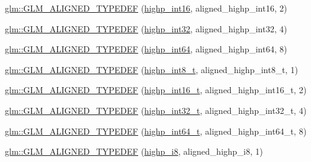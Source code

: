 \begin{DoxyCompactItemize}
\item 
\hyperlink{group__gtx__type__aligned_ga7a751b3aff24c0259f4a7357c2969089}{glm\+::\+G\+L\+M\+\_\+\+A\+L\+I\+G\+N\+E\+D\+\_\+\+T\+Y\+P\+E\+D\+EF} (\hyperlink{group__gtc__type__precision_gaf0430ed80e88c0d1dfbe47f359659c81}{highp\+\_\+int16}, aligned\+\_\+highp\+\_\+int16, 2)
\item 
\hyperlink{group__gtx__type__aligned_ga70cd2144351c556469ee6119e59971fc}{glm\+::\+G\+L\+M\+\_\+\+A\+L\+I\+G\+N\+E\+D\+\_\+\+T\+Y\+P\+E\+D\+EF} (\hyperlink{group__gtc__type__precision_gaa2045c92b9553d463191af6a20e997bb}{highp\+\_\+int32}, aligned\+\_\+highp\+\_\+int32, 4)
\item 
\hyperlink{group__gtx__type__aligned_ga46bbf08dc004d8c433041e0b5018a5d3}{glm\+::\+G\+L\+M\+\_\+\+A\+L\+I\+G\+N\+E\+D\+\_\+\+T\+Y\+P\+E\+D\+EF} (\hyperlink{group__gtc__type__precision_ga7ffb27943e9569800979081bc548621c}{highp\+\_\+int64}, aligned\+\_\+highp\+\_\+int64, 8)
\item 
\hyperlink{group__gtx__type__aligned_gab3e10c77a20d1abad2de1c561c7a5c18}{glm\+::\+G\+L\+M\+\_\+\+A\+L\+I\+G\+N\+E\+D\+\_\+\+T\+Y\+P\+E\+D\+EF} (\hyperlink{group__gtc__type__precision_ga417701b99e6e7992f35ab2ef694f88b2}{highp\+\_\+int8\+\_\+t}, aligned\+\_\+highp\+\_\+int8\+\_\+t, 1)
\item 
\hyperlink{group__gtx__type__aligned_ga968f30319ebeaca9ebcd3a25a8e139fb}{glm\+::\+G\+L\+M\+\_\+\+A\+L\+I\+G\+N\+E\+D\+\_\+\+T\+Y\+P\+E\+D\+EF} (\hyperlink{group__gtc__type__precision_ga07d318d61472e75238e53b9642227672}{highp\+\_\+int16\+\_\+t}, aligned\+\_\+highp\+\_\+int16\+\_\+t, 2)
\item 
\hyperlink{group__gtx__type__aligned_gaae773c28e6390c6aa76f5b678b7098a3}{glm\+::\+G\+L\+M\+\_\+\+A\+L\+I\+G\+N\+E\+D\+\_\+\+T\+Y\+P\+E\+D\+EF} (\hyperlink{group__gtc__type__precision_ga783d077a513c1f475f6cdb406b4238c3}{highp\+\_\+int32\+\_\+t}, aligned\+\_\+highp\+\_\+int32\+\_\+t, 4)
\item 
\hyperlink{group__gtx__type__aligned_ga790cfff1ca39d0ed696ffed980809311}{glm\+::\+G\+L\+M\+\_\+\+A\+L\+I\+G\+N\+E\+D\+\_\+\+T\+Y\+P\+E\+D\+EF} (\hyperlink{group__gtc__type__precision_ga0f5186bde44471133b08057cae8a51ac}{highp\+\_\+int64\+\_\+t}, aligned\+\_\+highp\+\_\+int64\+\_\+t, 8)
\item 
\hyperlink{group__gtx__type__aligned_ga8265b91eb23c120a9b0c3e381bc37b96}{glm\+::\+G\+L\+M\+\_\+\+A\+L\+I\+G\+N\+E\+D\+\_\+\+T\+Y\+P\+E\+D\+EF} (\hyperlink{group__gtc__type__precision_ga8b9eb0b24cce7f14478bfcacb53ce839}{highp\+\_\+i8}, aligned\+\_\+highp\+\_\+i8, 1)

\end{DoxyCompactItemize}
